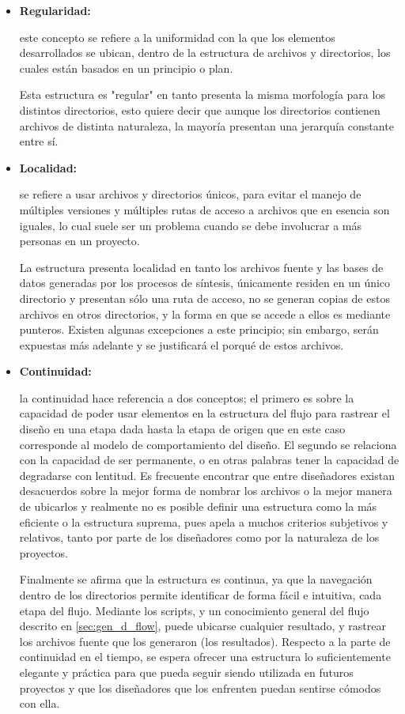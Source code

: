 \begin{itemize}
\item {\textbf{Regularidad:}} {este concepto se refiere a la uniformidad con la que los elementos desarrollados se ubican, dentro de la estructura de archivos y directorios, los cuales están basados en un principio o plan.

Esta estructura es "regular" en tanto presenta la misma morfología para los distintos directorios, esto quiere decir que aunque los directorios contienen archivos de distinta naturaleza, la mayoría presentan una jerarquía constante entre sí.}

\item {\textbf{Localidad:}} {se refiere a usar archivos y directorios únicos, para evitar el manejo de múltiples versiones y múltiples rutas de acceso a archivos que en esencia son iguales, lo cual suele ser un problema cuando se debe involucrar a más personas en un proyecto.

La estructura presenta localidad en tanto los archivos fuente y las bases de datos generadas por los procesos de síntesis, únicamente residen en un único directorio y presentan sólo una ruta de acceso, no se generan copias de estos archivos en otros directorios, y la forma en que se accede a ellos es mediante punteros. Existen algunas excepciones a este principio; sin embargo, serán expuestas más adelante y se justificará el porqué de estos archivos.}

\item {\textbf{Continuidad:}} {la continuidad hace referencia a dos conceptos; el primero es sobre la capacidad de poder usar elementos en la estructura del flujo para rastrear el diseño en una etapa dada hasta la etapa de origen que en este caso corresponde al modelo de comportamiento del diseño. El segundo se relaciona con la capacidad de ser permanente, o en otras palabras tener la capacidad de degradarse con lentitud. Es frecuente encontrar que entre diseñadores existan desacuerdos sobre la mejor forma de nombrar los archivos o la mejor manera de ubicarlos y realmente no es posible definir una estructura como la más eficiente o la estructura suprema, pues apela a muchos criterios subjetivos y relativos, tanto por parte de los diseñadores como por la naturaleza de los proyectos. 

Finalmente se afirma que la estructura es continua, ya que la navegación dentro de los directorios permite identificar de forma fácil e intuitiva, cada etapa del flujo. Mediante los scripts, y un conocimiento general del flujo descrito en \ref{sec:gen_d_flow}, puede ubicarse cualquier resultado, y rastrear los archivos fuente que los generaron (los resultados). Respecto a la parte de continuidad en el tiempo, se espera ofrecer una estructura lo suficientemente elegante y práctica para que pueda seguir siendo utilizada en futuros proyectos y que los diseñadores que los enfrenten puedan sentirse cómodos con ella.}

\end{itemize}

